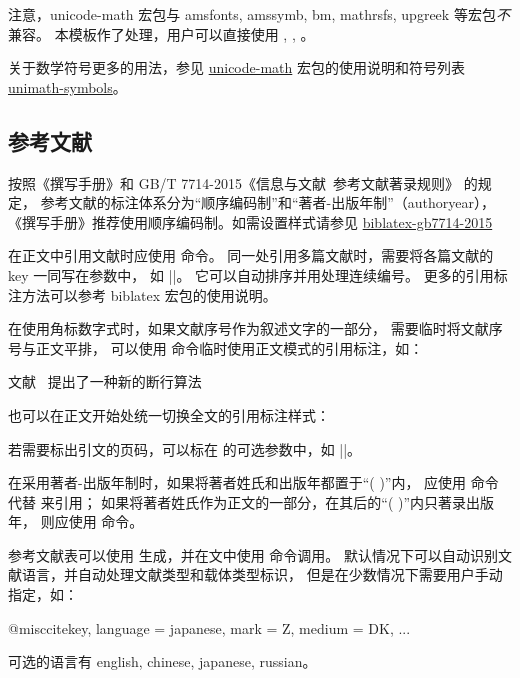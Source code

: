 \documentclass[a4paper]{ltxdoc}
\makeatletter
\DeclareRobustCommand\pkg{\textsf}
\def\DescribeOption{\leavevmode\@bsphack\begingroup\MakePrivateLetters
  \Describe@Option}
\def\Describe@Option#1{\endgroup
              \marginpar{\raggedleft\PrintDescribeOption{#1}}%
              \SpecialEnvIndex{#1}\@esphack\ignorespaces}
\makeatother
\begin{document}
注意，\pkg{unicode-math} 宏包与 \pkg{amsfonts}, \pkg{amssymb}, \pkg{bm},
\pkg{mathrsfs}, \pkg{upgreek} 等宏包\emph{不}兼容。
本模板作了处理，用户可以直接使用 , ,
。

关于数学符号更多的用法，参见
\href{http://mirrors.ctan.org/macros/latex/contrib/unicode-math/unicode-math.pdf}{\pkg{unicode-math}}
宏包的使用说明和符号列表
\href{http://mirrors.ctan.org/macros/latex/contrib/unicode-math/unimath-symbols.pdf}{\pkg{unimath-symbols}}。


\subsection{参考文献}

按照《撰写手册》和 GB/T 7714-2015《信息与文献\ 参考文献著录规则》 的规定，
参考文献的标注体系分为“顺序编码制”和“著者-出版年制”（authoryear），
《撰写手册》推荐使用顺序编码制。如需设置样式请参见 \href{https://github.com/hushidong/biblatex-gb7714-2015}{biblatex-gb7714-2015}

\DescribeMacro{\cite}
在正文中引用文献时应使用  命令。
同一处引用多篇文献时，需要将各篇文献的 key 一同写在参数中，
如 |\cite{knuth84,lamport94,mittelbach04}|。
它可以自动排序并用处理连续编号。
更多的引用标注方法可以参考 \pkg{biblatex} 宏包的使用说明。

\DescribeMacro{\inlinecite}
\DescribeOption{cite-style}
在使用角标数字式时，如果文献序号作为叙述文字的一部分，
需要临时将文献序号与正文平排，
可以使用  命令临时使用正文模式的引用标注，如：
\begin{latex}
  文献~ 提出了一种新的断行算法
\end{latex}
也可以在正文开始处统一切换全文的引用标注样式：
\begin{latex}
  \xustsetup{}
    cite-style = inline,
  }
\end{latex}

若需要标出引文的页码，可以标在  的可选参数中，如 |\cite[42]{abc}|。

\DescribeMacro{\citep}
\DescribeMacro{\citet}
在采用著者-出版年制时，如果将著者姓氏和出版年都置于“( )”内，
应使用  命令代替  来引用；
如果将著者姓氏作为正文的一部分，在其后的“( )”内只著录出版年，
则应使用  命令。

\DescribeMacro{\printbibliography}
参考文献表可以使用 \BibTeX{} 生成，并在文中使用  命令调用。
\BibTeX{} 默认情况下可以自动识别文献语言，并自动处理文献类型和载体类型标识，
但是在少数情况下需要用户手动指定，如：
\begin{latex}
  @misc{citekey,
    language = {japanese},
    mark     = {Z},
    medium   = {DK},
    ...
  }
\end{latex}
可选的语言有 english, chinese, japanese, russian。
\end{document}
